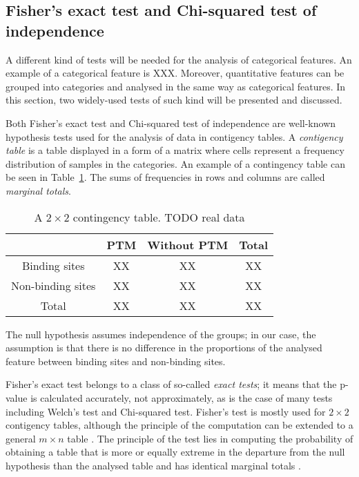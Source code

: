 \subsection{Fisher's exact test and Chi-squared test of independence}

A different kind of tests will be needed for the analysis of categorical features. An example of a categorical feature is XXX. Moreover, quantitative features can be grouped into categories and analysed in the same way as categorical features. In this section, two widely-used tests of such kind will be presented and discussed.

Both Fisher's exact test and Chi-squared test of independence are well-known hypothesis tests used for the analysis of data in contigency tables. A \textit{contigency table} is a table displayed in a form of a matrix where cells represent a frequency distribution of samples in the categories. An example of a contingency table can be seen in Table~\ref{tab:contingency_table_example}. The sums of frequencies in rows and columns are called \textit{marginal totals}.

\begin{table}[!htbp]
\centering
\renewcommand{\arraystretch}{1.5}
 \begin{tabular}{|c|c|c||c|} 
 \hline
  & PTM & Without PTM & Total \\ [0.5ex] 
 \hline
 Binding sites & XX & XX & XX \\ 
 \hline
 Non-binding sites & XX & XX & XX \\
 \hline\hline
 Total & XX & XX & XX \\
 \hline
\end{tabular}
\caption{A $2\times 2$ contingency table. TODO real data}\label{tab:contingency_table_example}
\end{table}

The null hypothesis assumes independence of the groups; in our case, the assumption is that there is no difference in the proportions of the analysed feature between binding sites and non-binding sites.

Fisher's exact test belongs to a class of so-called \textit{exact tests}; it means that the p-value is calculated accurately, not approximately, as is the case of many tests including Welch's test and Chi-squared test. Fisher's test is mostly used for $2\times 2$ contigency tables, although the principle of the computation can be extended to a general $m\times n$ table \cite{Mehta}. The principle of the test lies in computing the probability of obtaining a table that is more or equally extreme in the departure from the null hypothesis than the analysed table and has identical marginal totals \cite{bland}.

